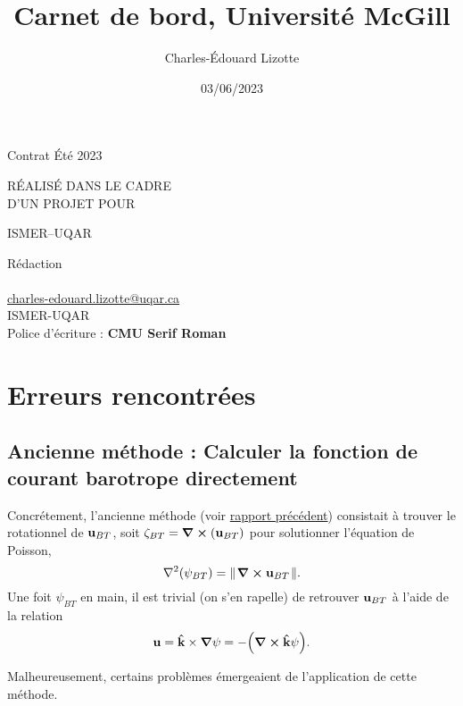 \documentclass[10pt]{article}
\author{Charles-Édouard Lizotte}
\date{03/06/2023}
\title{Carnet de bord, Université McGill}
\makeatletter
\numberwithin{equation}{section}
\newcommand{\kvf}{\vb{\hat{k}}}
\newcommand{\uu}{\vb{u}}
\newcommand{\pt}{\hspace{1pt}} %
\newcommand{\mytitlepage}{
\begin{titlepage}
\begin{center}
{\Huge \thesubtitle \par}
\vspace{2cm}
{\Huge \MakeUppercase{\thetitle} \par}
\vspace{2cm}
RÉALISÉ DANS LE CADRE\\ D'UN PROJET POUR \par
\vspace{2cm}
{\Huge ISMER--UQAR \par}
\vspace{2cm}
{\thedate}
\end{center}
\vfill
Rédaction \\
{\theauthor}\\
\url{charles-edouard.lizotte@uqar.ca}\\
ISMER-UQAR\\
Police d'écriture : \textbf{CMU Serif Roman}
\end{titlepage}
}
\newcommand{\thesubtitle}{Contrat Été 2023}
\makeatother
\begin{document}
\mytitlepage
\tableofcontents\newpage
\section{Erreurs rencontrées}
\label{sec:orgbbe5cec}

\subsection{Ancienne méthode : Calculer la fonction de courant barotrope directement}
\label{sec:orgcfffd93}
Concrétement, l'ancienne méthode (voir \href{rapport-2023-04-28.org}{rapport précédent}) consistait à trouver le rotationnel de \(\uu_{BT}\), soit \(\zeta_{BT} = \curl(\uu_{BT})\) pour solutionner l'équation de Poisson,
\begin{equation}
\label{eq:org220625b}
   \laplacian(\psi_{BT}) =  \norm{\pt\curl{\uu_{BT}}\pt}.
\end{equation}
Une foit \(\psi_{BT}\) en main, il est trivial (on s'en rapelle) de retrouver \(\uu_{BT}\) à l'aide de la relation
\begin{equation}
   \uu = \kvf\times\gradient{\psi} = - \qty(\curl{\kvf\psi}).
\end{equation}

Malheureusement, certains problèmes émergeaient de l'application de cette méthode.
\end{document}
